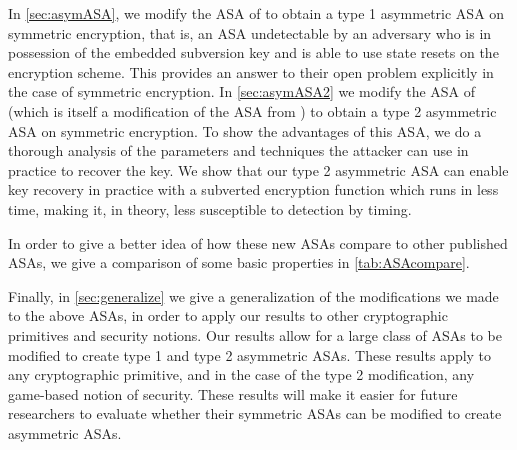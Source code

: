 In \autoref{sec:asymASA}, we modify the ASA of \cite{C:BelPatRog14} to obtain a type 1 asymmetric ASA on symmetric encryption, that is, an ASA undetectable by an adversary who is in possession of the embedded subversion key and is able to use state resets on the encryption scheme. This provides an answer to their open problem explicitly in the case of symmetric encryption. In \autoref{sec:asymASA2} we modify the ASA of \cite{CCS:BelJaeKan15} (which is itself a modification of the ASA from \cite{C:BelPatRog14}) to obtain a type 2 asymmetric ASA on symmetric encryption. To show the advantages of this ASA, we do a thorough analysis of the parameters and techniques the attacker can use in practice to recover the key. We show that our type 2 asymmetric ASA can enable key recovery in practice with a subverted encryption function which runs in less time, making it, in theory, less susceptible to detection by timing.

In order to give a better idea of how these new ASAs compare to other published ASAs, we give a comparison of some basic properties in \autoref{tab:ASAcompare}.

Finally, in \autoref{sec:generalize} we give a generalization of the modifications we made to the above ASAs, in order to apply our results to other cryptographic primitives and security notions. Our results allow for a large class of ASAs to be modified to create type 1 and type 2 asymmetric ASAs. These results apply to any cryptographic primitive, and in the case of the type 2 modification, any game-based notion of security. These results will make it easier for future researchers to evaluate whether their symmetric ASAs can be modified to create asymmetric ASAs.

